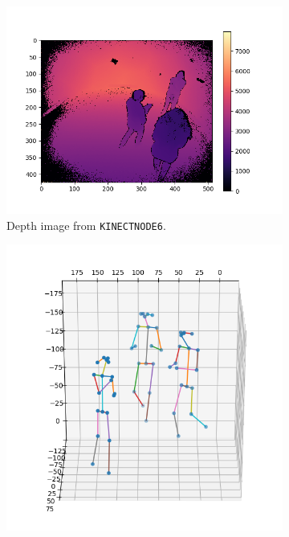 \begin{figure}
  \centering
  \begin{subfigure}{.6\textwidth}
    \centering
    \includegraphics[width=\linewidth]{img/depth_image}
    \caption{Depth image from \texttt{KINECTNODE6}.}
    \label{fig:depth_image}
  \end{subfigure}%
  \begin{subfigure}{.4\textwidth}
    \centering
    \includegraphics[width=\linewidth]{img/dataset_skeletons}

\end{subfigure}
\end{figure}
